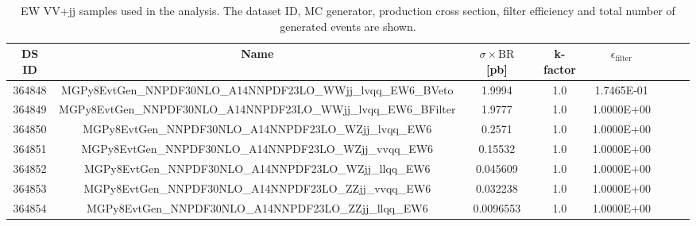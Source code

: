 \begin{landscape}
\begin{table}[!htbp]
\begin{center}
\small
\caption{
EW VV+jj samples used in the analysis. The dataset ID, MC generator, production cross section, filter efficiency and total number of generated events are shown.
}
\begin{tabular}{c|c|c|c|c|c|c|c}
\hline

\hline
DS ID & Name & $\sigma\times\text{BR}$ [pb] & k-factor & $\epsilon_{\text{filter}}$  \\ 
\hline

364848  & MGPy8EvtGen\_NNPDF30NLO\_A14NNPDF23LO\_WWjj\_lvqq\_EW6\_BVeto   & 1.9994        &  1.0      & 1.7465E-01  \\
364849  & MGPy8EvtGen\_NNPDF30NLO\_A14NNPDF23LO\_WWjj\_lvqq\_EW6\_BFilter & 1.9777        &  1.0      & 1.0000E+00  \\
364850  & MGPy8EvtGen\_NNPDF30NLO\_A14NNPDF23LO\_WZjj\_lvqq\_EW6         & 0.2571        &  1.0      & 1.0000E+00  \\
364851  & MGPy8EvtGen\_NNPDF30NLO\_A14NNPDF23LO\_WZjj\_vvqq\_EW6         & 0.15532       &  1.0      & 1.0000E+00  \\
364852  & MGPy8EvtGen\_NNPDF30NLO\_A14NNPDF23LO\_WZjj\_llqq\_EW6         & 0.045609      &  1.0      & 1.0000E+00  \\
364853  & MGPy8EvtGen\_NNPDF30NLO\_A14NNPDF23LO\_ZZjj\_vvqq\_EW6         & 0.032238      &  1.0      & 1.0000E+00  \\
364854  & MGPy8EvtGen\_NNPDF30NLO\_A14NNPDF23LO\_ZZjj\_llqq\_EW6         & 0.0096553     &  1.0      & 1.0000E+00  \\

\hline
\end{tabular}
\label{tabular:mc_samples_ewvvjj}
\end{center}
\end{table}
\end{landscape}



